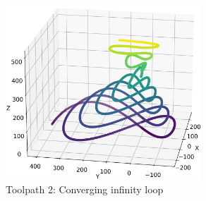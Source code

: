 
\begin{figure}[H]%
	\centering
	\includegraphics[width=0.65\textwidth]{figures/path2.png}
	\caption{Toolpath 2: Converging infinity loop}
	\label{path2}
\end{figure}





